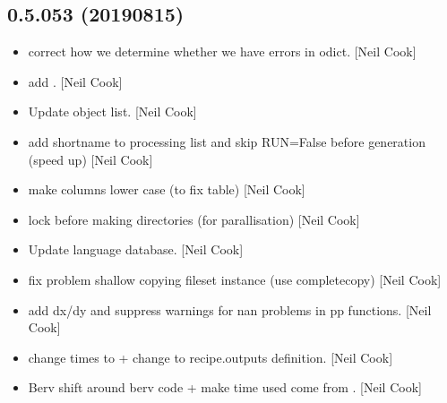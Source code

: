 \documentclass[a4paper,10pt,english]{report}
\begin{document}
\subsection{0.5.053 (2019\sphinxhyphen{}08\sphinxhyphen{}15)}
\label{\detokenize{misc/changelog:id108}}\begin{itemize}
\item {} 
 \sphinxhyphen{} correct how we determine whether
we have errors in odict. {[}Neil Cook{]}

\item {} 
 \sphinxhyphen{} add . {[}Neil Cook{]}

\item {} 
Update object list. {[}Neil Cook{]}

\item {} 
 \sphinxhyphen{} add shortname to processing list
and skip RUN=False before generation (speed up) {[}Neil Cook{]}

\item {} 
 \sphinxhyphen{} make columns lower case (to fix table) {[}Neil
Cook{]}

\item {} 
 \sphinxhyphen{} lock before making directories (for
parallisation) {[}Neil Cook{]}

\item {} 
Update language database. {[}Neil Cook{]}

\item {} 
 \sphinxhyphen{} fix problem shallow copying
fileset instance (use completecopy) {[}Neil Cook{]}

\item {} 
 \sphinxhyphen{} add dx/dy and suppress warnings
for nan problems in pp functions. {[}Neil Cook{]}

\item {} 
 \sphinxhyphen{} change times to  + change  to
recipe.outputs definition. {[}Neil Cook{]}

\item {} 
Berv \sphinxhyphen{} shift around berv code + make time used come from .
{[}Neil Cook{]}


\end{itemize}
\end{document}
